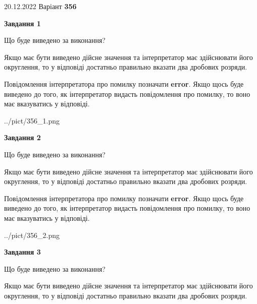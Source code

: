 \documentclass[12pt, ukrainian]{article}
\begin{document}
{20.12.2022 Варіант \No \textbf { 356 }\par}
{
\begin {Large}

{\begin {center}\textbf{Завдання 1}\end {center}}\par
Що буде виведено за виконання? \par

Якщо має бути виведено дійсне значення та інтерпретатор має здійснювати його округлення, 
то у відповіді достатньо правильно вказати два дробових розряди.

Повідомлення інтерпретатора про помилку позначати \textbf{error}.
Якщо щось буде виведено до того, як інтерпретатор видасть повідомлення про помилку, 
то воно має вказуватись у відповіді. \par

\begin{center}
	{../pict/356_1.png}
\end{center}
\newpage

{\begin {center}\textbf{Завдання 2}\end {center}}\par
Що буде виведено за виконання? \par

Якщо має бути виведено дійсне значення та інтерпретатор має здійснювати його округлення, 
то у відповіді достатньо правильно вказати два дробових розряди.

Повідомлення інтерпретатора про помилку позначати \textbf{error}.
Якщо щось буде виведено до того, як інтерпретатор видасть повідомлення про помилку, 
то воно має вказуватись у відповіді. \par

\begin{center}
	{../pict/356_2.png}
\end{center}
\newpage

{\begin {center}\textbf{Завдання 3}\end {center}}\par
Що буде виведено за виконання? \par

Якщо має бути виведено дійсне значення та інтерпретатор має здійснювати його округлення, 
то у відповіді достатньо правильно вказати два дробових розряди.


\end{Large}}
\end{document}
